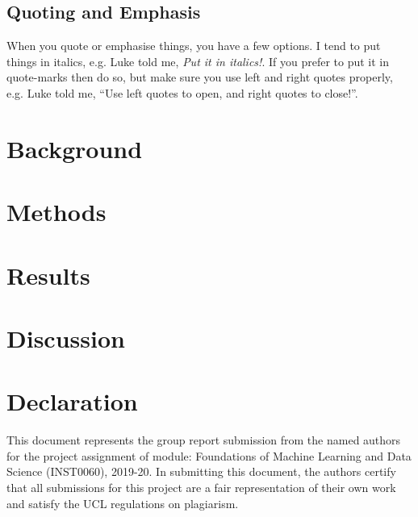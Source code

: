 \documentclass[11point]{article}
\begin{document}
\subsection{Quoting and Emphasis}
When you quote or emphasise things, you have a few options. I tend to put things in italics, e.g. Luke told me, \emph{Put it in italics!}. If you prefer to put it in quote-marks then do so, but make sure you use left and right quotes properly, e.g. Luke told me, ``Use left quotes to open, and right quotes to close!''.


\section{Background}
\section{Methods}
\section{Results}
\section{Discussion}


\section*{Declaration}
This document represents the group report submission from the named authors for the project assignment of module: Foundations of Machine Learning and Data Science (INST0060), 2019-20. In submitting this document, the authors certify that all submissions for this project are a fair representation of their own work and satisfy the UCL regulations on  plagiarism.



\end{document}
